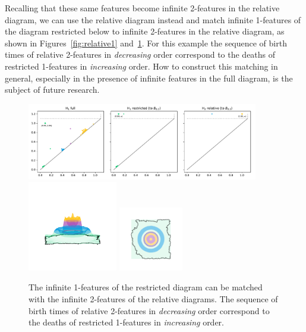 Recalling that these same features become infinite 2-features in the relative diagram, we can use the relative diagram instead and match infinite 1-features of the diagram restricted below to infinite 2-features in the relative diagram, as shown in Figures~\ref{fig:relative1} and~\ref{fig:relative2}.
For this example the sequence of birth times of relative 2-features in \emph{decreasing} order correspond to the deaths of restricted 1-features in \emph{increasing} order.
How to construct this matching in general, especially in the presence of infinite features in the full diagram, is the subject of future research.

\begin{figure}[htbp]
  \centering
  \includegraphics[width=0.9\textwidth]{figures/relative-dgm-0_1.pdf}
  \includegraphics[trim=500 800 500 800, clip, width=0.35\textwidth]{figures/relative-surf_side-0_1.png}
  \includegraphics[trim=500 500 500 500, clip, width=0.25\textwidth]{figures/relative-surf_top-0_1.png}
  \caption{The infinite 1-features of the restricted diagram can be matched with the infinite 2-features of the relative diagrams.
  The sequence of birth times of relative 2-features in \emph{decreasing} order correspond to the deaths of restricted 1-features in \emph{increasing} order.}\label{fig:relative2}
\end{figure}
